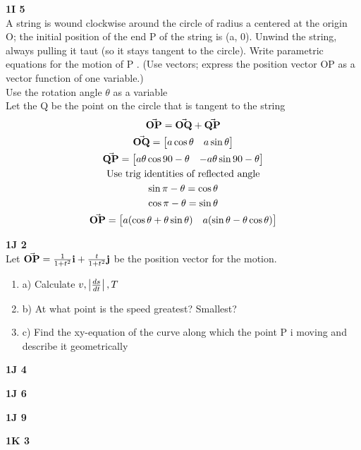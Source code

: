 \documentclass[11pt]{article}
\begin{document}
    \begin{problem}
        \textbf{1I 5}\\
        A string is wound clockwise around the circle of radius a centered at the origin O; the initial position of the end P of the string is (a, 0). Unwind the string, always pulling it taut (so it stays tangent to the circle). Write parametric equations for the motion of P .
        (Use vectors; express the position vector OP as a vector function of one variable.)\\
        Use the rotation angle $\theta$ as a variable\\
        Let the Q be the point on the circle that is tangent to the string
        \begin{gather*}
            \va{OP} = \va{OQ} + \va{QP} \\
            \va{OQ} = \bmqty{a\cos{\theta} & a\sin{\theta}} \\
            \va{QP} = \bmqty{a\theta \cos{90 - \theta} & -a\theta \sin{90 - \theta}}\\
            \text{Use trig identities of reflected angle}\\
            \sin{\pi - \theta} = \cos{\theta}\\
            \cos{\pi - \theta} = \sin{\theta}\\
            \va{OP} = \bmqty{a(\cos{\theta} + \theta\sin{\theta}) & a(\sin{\theta} - \theta\cos{\theta})}
        \end{gather*}

    \end{problem}

    \begin{problem}
        \textbf{1J 2}\\
        Let $\va{OP} = \frac { 1 } { 1 + t ^ { 2 } } \mathbf { i } + \frac { t } { 1 + t ^ { 2 } } \mathbf { j }$ be the position vector for the motion.
        \begin{enumerate}
            \item a) Calculate $v, \vmqty{\frac{ds}{dt}}, T $
            \item b) At what point is the speed greatest? Smallest?
            \item c) Find the xy-equation of the curve along which the point P i moving and describe it geometrically
        \end{enumerate}
    \end{problem}

    \begin{problem}
        \textbf{1J 4}
    \end{problem}

    \begin{problem}
        \textbf{1J 6}
    \end{problem}

    \begin{problem}
        \textbf{1J 9}
    \end{problem}

    \begin{problem}
        \textbf{1K 3}
    \end{problem}
\end{document}
